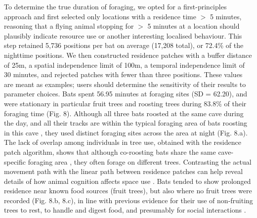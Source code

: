\begin{refsection}[sorting=nyt]
    To determine the true duration of foraging, we opted for a first-principles approach and first selected only locations with a residence time $>$ 5 minutes, reasoning that a flying animal stopping for $>$ 5 minutes at a location should plausibly indicate resource use or another interesting localised behaviour.
    This step retained 5,736 positions per bat on average (17,208 total), or 72.4\% of the nighttime positions.
    We then constructed residence patches with a buffer distance of 25m, a spatial independence limit of 100m, a temporal independence limit of 30 minutes, and rejected patches with fewer than three positions.
    These values are meant as examples; users should determine the sensitivity of their results to parameter choices.
    Bats spent 56.95 minutes at foraging sites (SD = 62.20), and were stationary in particular fruit trees and roosting trees during 83.8\% of their foraging time (Fig. 8).
    Although all three bats roosted at the same cave during the day, and all their tracks are within the typical foraging area of bats roosting in this cave \citep{lourie2021}, they used distinct foraging sites across the area at night (Fig. 8.a). The lack of overlap among individuals in tree use, obtained with the residence patch algorithm, shows that although co-roosting bats share the same cave-specific foraging area \citep{lourie2021}, they often forage on different trees.
    Contrasting the actual movement path with the linear path between residence patches can help reveal details of how animal cognition affects space use \citep{toledo2020}.
    Bats tended to show prolonged residence near known food sources (fruit trees), but also where no fruit trees were recorded (Fig. 8.b, 8.c), in line with previous evidence for their use of non-fruiting trees to rest, to handle and digest food, and presumably for social interactions \citep{tsoar2011}.


\end{refsection}
